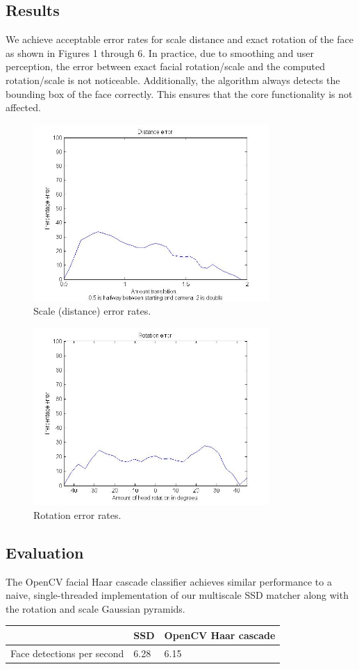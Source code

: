\documentclass[10pt,twocolumn,letterpaper]{article}
\begin{document}
\subsection*{Results}
We achieve acceptable error rates for scale distance and exact rotation of the face as shown in Figures 1 through 6. In practice, due to smoothing and user perception, the error between exact facial rotation/scale and the computed rotation/scale is not noticeable. Additionally, the algorithm always detects the bounding box of the face correctly. This ensures that the core functionality is not affected.

\begin{figure}[ht!]
\centering
\includegraphics[width=90mm]{distance_error.jpg}
\caption{Scale (distance) error rates.\label{overflow}}
\end{figure}
\begin{figure}[ht!]
\centering
\includegraphics[width=90mm]{rotation_error.jpg}
\caption{Rotation error rates.\label{overflow}}
\end{figure}

\subsection*{Evaluation}
The OpenCV facial Haar cascade classifier achieves similar performance to a naive, single-threaded implementation of our multiscale SSD matcher along with the rotation and scale Gaussian pyramids.
\begin{center}
    \begin{tabular}{| l | l | l |}
    \hline
    \         & \textbf{SSD} & \textbf{OpenCV Haar cascade} \\ \hline
    Face detections per second & 6.28 & 6.15 \\  \hline
    \end{tabular}
\end{center}
\end{document}

